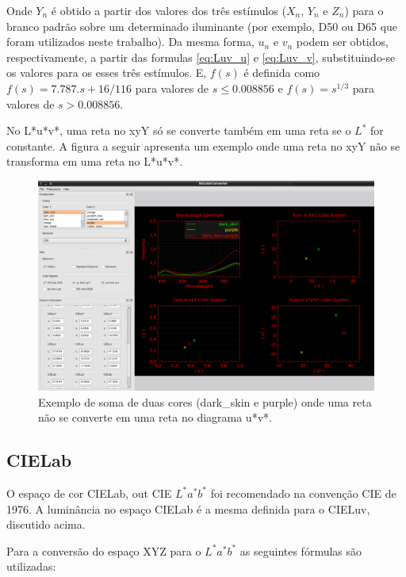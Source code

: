 \documentclass[a4paper,10pt]{report}
\begin{document}
\par
Onde $Y_n$ é obtido a partir dos valores dos três estímulos ($X_n$, $Y_n$ e
$Z_n$) para o branco padrão sobre um determinado iluminante (por exemplo, D50
ou D65 que foram utilizados neste trabalho). Da mesma forma, $u_n$ e $v_n$
podem ser obtidos, respectivamente, a partir das formulas \ref{eq:Luv_u} e
\ref{eq:Luv_v}, substituindo-se os valores para os esses três estímulos. E,
$f(s)$ é definida como $f(s) = 7.787.s+16/116$ para valores de $s \le 0.008856$
e $f(s) = s^{1/3}$ para valores de $s > 0.008856$.

\par
No L*u*v*, uma reta no xyY só se converte também em uma reta se o $L^*$ for
constante. A figura a seguir apresenta um exemplo onde uma reta no xyY não se
transforma em uma reta no L*u*v*.

\begin{figure}[!htb]
     \centering
     \includegraphics[scale=0.6]{img/luv_no_linearity.png}
     \caption{Exemplo de soma de duas cores (dark_skin e purple) onde uma reta
não se converte em uma reta no diagrama u*v*.}
     \label{fig:luv_no_linearity}
\end{figure}


\subsection{CIELab}
\par
O espaço de cor CIELab, out CIE $L^* a^* b^*$ foi recomendado na convenção CIE
de 1976. A luminância no espaço CIELab é a mesma definida para o CIELuv,
discutido acima.

\par
Para a conversão do espaço XYZ para o $L^*a^*b^*$ as seguintes fórmulas são
utilizadas:
\end{document}

